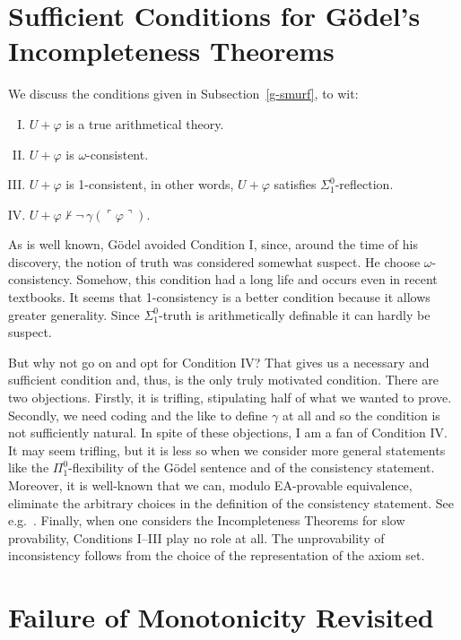 \documentclass{amsart}
\renewcommand{\phi}{\varphi}
\newcommand{\gnum}[1]{{\ulcorner #1 \urcorner}}
\begin{document}
\appendix

\section{Sufficient Conditions for G\"odel's Incompleteness Theorems}\label{donaldsmurf}
We discuss the conditions given in Subsection~\ref{g-smurf}, to wit:
  \begin{enumerate}[I.]
  \item
  $U+\phi$ is a true arithmetical theory.
  \item
  $U+\phi$ is $\omega$-consistent.
  \item
  $U+\phi$ is 1-consistent, in other words, $U+\phi$ satisfies $\Sigma^0_1$-reflection.
  \item
  $U+\phi \nvdash \neg\, \gamma(\gnum\phi)$.
  \end{enumerate}

   As is well known, G\"odel avoided Condition I, since, around the time of his discovery, the notion of
  truth was considered somewhat suspect. He choose $\omega$-consistency. Somehow, this condition had a long life and occurs
  even in recent textbooks. It seems that 1-consistency is a better condition because it allows greater generality.
  Since $\Sigma^0_1$-truth is arithmetically definable it can hardly be suspect. 
  
  But why not go on and
  opt for Condition IV? That gives us a necessary and sufficient condition and, thus, is the only truly
  motivated condition. There are two objections. Firstly, it is trifling, stipulating half of what we wanted to
  prove. Secondly, we need coding and the like to define $\gamma$ at all and so the condition is not sufficiently natural.
  In spite of these objections, I am a fan of Condition IV. It may seem trifling, but it is less so when we
  consider more general statements like the $\Pi^0_1$-flexibility of the G\"odel sentence and of the consistency statement.
  Moreover, it is well-known that we can, modulo {\sf EA}-provable equivalence, eliminate the arbitrary choices
  in the definition of the consistency statement. See e.g.\ \cite{viss:seco11}. Finally, when one considers the
  Incompleteness Theorems for slow provability, Conditions I--III  play no role at all.
  The unprovability of inconsistency follows from the choice of the representation of the axiom set. 


\section{Failure of Monotonicity Revisited}\label{gastsmurf}
\end{document}
